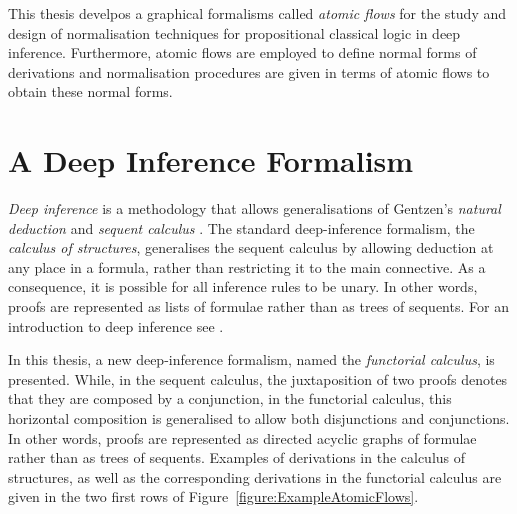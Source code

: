 This thesis develpos a graphical formalisms called \emph{atomic flows} for the study and design of normalisation techniques for propositional classical logic in deep inference. Furthermore, atomic flows are employed to define normal forms of derivations and normalisation procedures are given in terms of atomic flows to obtain these normal forms.

\section{A Deep Inference Formalism}

\emph{Deep inference} \cite{Gugl:06:A-System:kl} is a methodology that allows generalisations of Gentzen's \emph{natural deduction} and \emph{sequent calculus} \cite{Gent:69:Investig:xi}. The standard deep-inference formalism, the \emph{calculus of structures}, generalises the sequent calculus by allowing deduction at any place in a formula, rather than restricting it to the main connective. As a consequence, it is possible for all inference rules to be unary. In other words, proofs are represented as lists of formulae rather than as trees of sequents. For an introduction to deep inference see \cite{Gugl::Deep-Inf:uq}.

In this thesis, a new deep-inference formalism, named the \emph{functorial calculus}, is presented. While, in the sequent calculus, the juxtaposition of two proofs denotes that they are composed by a conjunction, in the functorial calculus, this horizontal composition is generalised to allow both disjunctions and conjunctions. In other words, proofs are represented as directed acyclic graphs of formulae rather than as trees of sequents. Examples of derivations in the calculus of structures, as well as the corresponding derivations in the functorial calculus are given in the two first rows of Figure~\vref{figure:ExampleAtomicFlows}.

\newcommand{\ai   }{{\mathsf{ai}}}
\newcommand{\aw   }{{\mathsf{aw}}}
\newcommand{\ac   }{{\mathsf{ac}}}
\newcommand{\aid  }{{\ai{\downarrow}}}
\newcommand{\awd  }{{\aw{\downarrow}}}
\newcommand{\acd  }{{\ac{\downarrow}}}
\newcommand{\aiu  }{{\ai{\uparrow}}}
\newcommand{\awu  }{{\aw{\uparrow}}}
\newcommand{\acu  }{{\ac{\uparrow}}}
\newcommand{\swi  }{\mathsf{s}}
\newcommand{\med  }{\mathsf{m}}
\newcommand{\asor }{{=_\mathsf{a}{\downarrow}}}
\newcommand{\asand}{{=_\mathsf{a}{\uparrow}}}
\newcommand{\coor }{{=_{\vee\mathsf{c}}}}
\newcommand{\coand}{{=_{\wedge\mathsf{c}}}}
\newcommand{\fffd }{{{=_{\fff}}{\downarrow}}}
\newcommand{\fffu }{{{=_{\fff}}{\uparrow}}}
\newcommand{\tttd }{{{=_{\ttt}}{\downarrow}}}
\newcommand{\tttu }{{{=_{\ttt}}{\uparrow}}}
\newcommand{\tttord }{{{=_{\ttt\vee}}{\downarrow}}}
\newcommand{\fffandd }{{{=_{\fff\wedge}}{\downarrow}}}
\newcommand{\tttoru }{{{=_{\ttt\vee}}{\uparrow}}}
\newcommand{\fffandu }{{{=_{\fff\wedge}}{\uparrow}}}

